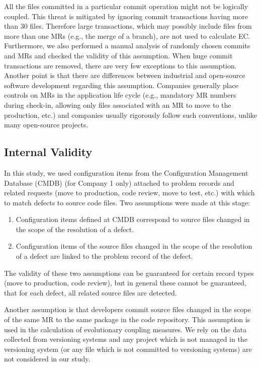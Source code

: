 \documentclass[times]{smrauth}
\begin{document}
All the files committed in a particular commit operation might not be logically coupled. This threat is mitigated by ignoring commit transactions having more than 30 files. Therefore large transactions, which may possibly include files from more than one MRs (e.g., the merge of a branch), are not used to calculate EC. Furthermore, we also performed a manual analysis of randomly chosen commits and MRs and checked the validity of this assumption. When huge commit transactions are removed, there are very few exceptions to this assumption. Another point is that there are differences between industrial and open-source software development regarding this assumption. Companies generally place controls on MRs in the application life cycle  (e.g., mandatory MR numbers during check-in, allowing only files associated with an MR to move to the production, etc.) and companies usually rigorously follow such conventions, unlike many open-source projects.


\subsection{Internal Validity}

In this study, we used configuration items from the Configuration Management Database (CMDB) (for Company 1 only) attached to problem records and related requests (move to production, code review, move to test, etc.) with which to match defects to source code files. Two assumptions were made at this stage:

\vspace{-1.5mm} 
\begin{enumerate}
\item Configuration items defined at CMDB correspond to source files changed in the scope of the resolution of a defect.
\item Configuration items of the source files changed in the scope of the resolution of a defect are linked to the problem record of the defect.
\end{enumerate}

The validity of these two assumptions can be guaranteed for certain record types (move to production, code review), but in general these cannot be guaranteed, that for each defect, all related source files are detected.

Another assumption is that developers commit source files changed in the scope of the same MR to the same package in the code repository. This assumption is used in the calculation of evolutionary coupling measures. We rely on the data collected from versioning systems and any project which is not managed in the versioning system (or any file which is not committed to versioning systems) are not considered in our study.
\end{document}
